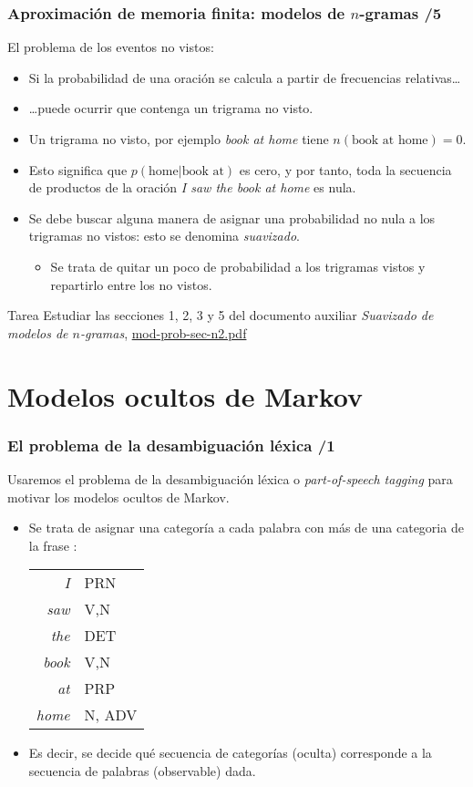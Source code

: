 \begin{frame}
\frametitle{Aproximación de memoria finita: modelos de \(n\)-gramas /5} 
El problema de los eventos no vistos:
\begin{itemize}
\item Si la probabilidad de una oración se calcula a partir de frecuencias relativas\ldots
\item \ldots puede ocurrir que contenga un trigrama no visto.
\item Un trigrama no visto, por ejemplo \emph{book at home} tiene \(n(\mbox{book at home})=0\).
\item Esto significa que \(p(\mbox{home}|\mbox{book at})\) es cero, y por tanto, toda la secuencia de productos de la oración \emph{I saw the book at home} es nula.
\item Se debe buscar alguna manera de asignar una probabilidad no nula a los trigramas no vistos: esto se denomina \emph{suavizado}.
  \begin{itemize}
  \item Se trata de quitar un poco de probabilidad a los trigramas vistos y repartirlo entre los no vistos.
  \end{itemize}
\end{itemize}
  \begin{block}{Tarea}
    Estudiar las secciones 1, 2, 3 y 5 
    del documento auxiliar \emph{Suavizado de modelos de \(n\)-gramas}, \url{mod-prob-sec-n2.pdf}
  \end{block}
\end{frame}

\section{Modelos ocultos de Markov}
\begin{frame}
  \frametitle{El problema de la desambiguación léxica /1}
Usaremos el problema de la desambiguación léxica o \emph{part-of-speech tagging} para motivar los modelos ocultos de Markov.

\begin{itemize}
\item Se trata de asignar una categoría a cada palabra con más de una
  categoria de la frase :

  \begin{center}
    \begin{tabular}{rl}
      \emph{I} & {PRN} \\
      \emph{saw} & {V,N}\\
      \emph{the} & {DET}\\
      \emph{book} & {V,N}\\
      \emph{at} & {PRP}\\
      \emph{home} & {N, ADV}\\
    \end{tabular}
  \end{center}

\item Es decir, se decide qué secuencia de categorías (oculta)
  corresponde a la secuencia de palabras (observable) dada.
\end{itemize}
\end{frame}

